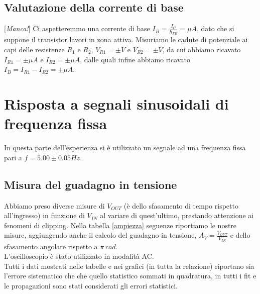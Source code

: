 \documentclass[10pt,a4paper]{article}
\newcommand{\rem}[1]{[\emph{#1}]}
\begin{document}
\subsection{Valutazione della corrente di base}
\rem{Manca!}
Ci aspetteremmo una corrente di base $I_B=\frac{I_C}{h_{FE}}= \mu A$, dato che si suppone il transistor lavori in zona attiva. Misuriamo le cadute di potenziale ai capi delle resistenze $R_1$ e $R_2$, $V_{R1}= \pm V$ e $V_{R2}= \pm V$, da cui abbiamo ricavato $I_{R1}= \pm \mu A$ e $I_{R2}= \pm \mu A$, dalle quali infine abbiamo ricavato $I_B=I_{R1}-I_{R2}= \pm \mu A$. 

\section{Risposta a segnali sinusoidali di frequenza fissa}
In questa parte dell'esperienza si è utilizzato un segnale ad una frequenza fissa pari a $f= 5.00\pm0.05 Hz$.

\subsection{Misura del guadagno in tensione}
Abbiamo preso diverse misure di $V_{OUT}$ (è dello sfasamento di tempo rispetto all'ingresso) in funzione di $V_{IN}$ al variare di quest'ultimo, prestando attenzione ai fenomeni di clipping. Nella tabella \ref{ampiezza} seguenze riportiamo le nostre misure, aggiungendo anche il calcolo del guadagno in tensione, $A_V=\frac{V_{OUT}}{V_{IN}}$ e dello sfasamento angolare rispetto a $\pi \,rad$.\\
L'oscilloscopio è stato utilizzato in modalità AC.\\
Tutti i dati mostrati nelle tabelle e nei grafici (in tutta la relazione) riportano sia l'errore sistematico che che quello statistico sommati in quadratura, in tutti i fit e le propagazioni sono stati considerati gli errori statistici.
\end{document}
